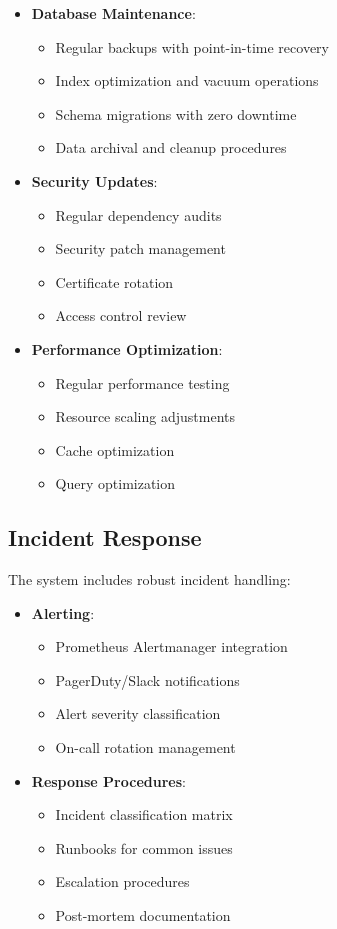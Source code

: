 \begin{itemize}
    \item \textbf{Database Maintenance}:
    \begin{itemize}
        \item Regular backups with point-in-time recovery
        \item Index optimization and vacuum operations
        \item Schema migrations with zero downtime
        \item Data archival and cleanup procedures
    \end{itemize}

    \item \textbf{Security Updates}:
    \begin{itemize}
        \item Regular dependency audits
        \item Security patch management
        \item Certificate rotation
        \item Access control review
    \end{itemize}

    \item \textbf{Performance Optimization}:
    \begin{itemize}
        \item Regular performance testing
        \item Resource scaling adjustments
        \item Cache optimization
        \item Query optimization
    \end{itemize}
\end{itemize}

\subsection{Incident Response}

The system includes robust incident handling:

\begin{itemize}
    \item \textbf{Alerting}:
    \begin{itemize}
        \item Prometheus Alertmanager integration
        \item PagerDuty/Slack notifications
        \item Alert severity classification
        \item On-call rotation management
    \end{itemize}

    \item \textbf{Response Procedures}:
    \begin{itemize}
        \item Incident classification matrix
        \item Runbooks for common issues
        \item Escalation procedures
        \item Post-mortem documentation
    \end{itemize}
\end{itemize}

